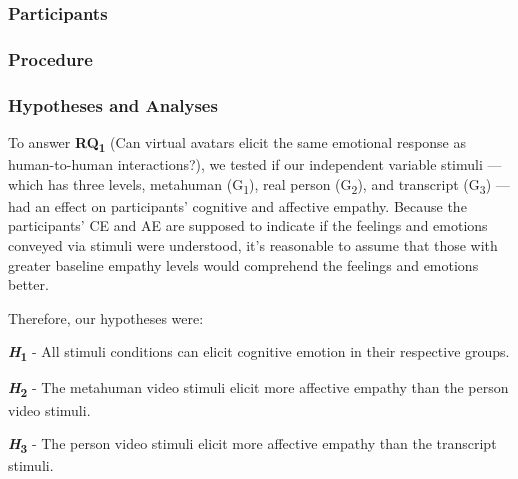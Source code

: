 \subsubsection{Participants}


\subsubsection{Procedure}


\subsubsection{Hypotheses and Analyses}
To answer \textbf{RQ\textsubscript{1}} (Can virtual avatars elicit the same emotional response as human-to-human interactions?), we tested if our independent variable stimuli --- which has three levels, metahuman (G\textsubscript{1}), real person (G\textsubscript{2}), and transcript (G\textsubscript{3}) --- had an effect on participants' cognitive and affective empathy. Because the participants' CE and AE are supposed to indicate if the feelings and emotions conveyed via stimuli were understood, it's reasonable to assume that those with greater baseline empathy levels would comprehend the feelings and emotions better.

Therefore, our hypotheses were:

\textbf{\textit{H}\textsubscript{1}} - All stimuli conditions can elicit cognitive emotion in their respective groups.

\textbf{\textit{H}\textsubscript{2}} - The metahuman video stimuli elicit more affective empathy than the person video stimuli.

\textbf{\textit{H}\textsubscript{3}} - The person video stimuli elicit more affective empathy than the transcript stimuli.



